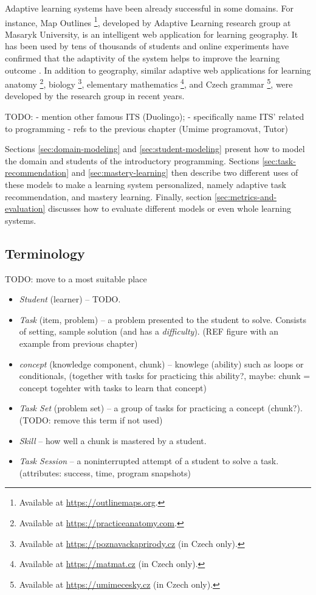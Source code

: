 Adaptive learning systems have been already successful in some domains.
For instance, Map Outlines%
  \footnote{Available at \url{https://outlinemaps.org}.},
  developed by Adaptive Learning research group at Masaryk University,
  is an intelligent web application for learning geography.
It has been used by tens of thousands of students
  and online experiments have confirmed
  that the adaptivity of the system helps to improve the learning outcome
  \cite{alg.evaluation-geography}.
In addition to geography, similar adaptive web applications
  for learning anatomy%
  \footnote{Available at \url{https://practiceanatomy.com}.},
  biology%
  \footnote{Available at \url{https://poznavackaprirody.cz} (in Czech only).},
  elementary mathematics%
  \footnote{Available at \url{https://matmat.cz} (in Czech only).},
  and Czech grammar%
  \footnote{Available at \url{https://umimecesky.cz} (in Czech only).},
  were developed by the research group in recent years.

TODO:
- mention other famous ITS (Duolingo);
- specifically name ITS' related to programming - refs to the previous
chapter (Umime programovat, Tutor)


Sections \ref{sec:domain-modeling} and \ref{sec:student-modeling} present how
to model the domain and students of the introductory programming.
Sections \ref{sec:task-recommendation} and \ref{sec:mastery-learning}
then describe two different uses of these models to make a learning system
personalized, namely adaptive task recommendation, and mastery learning.
Finally, section \ref{sec:metrics-and-evaluation} discusses how to evaluate
different models or even whole learning systems.

\subsection{Terminology}

TODO: move to a most suitable place

\begin{itemize}
\item \emph{Student} (learner) -- TODO.
\item \emph{Task} (item, problem)
  -- a problem presented to the student to solve.
  Consists of setting, sample solution (and has a \emph{difficulty}).
  (REF figure with an example from previous chapter)
\item \emph{concept} (knowledge component, chunk)
  -- knowlege (ability) such as loops or conditionals,
  (together with tasks for practicing this ability?,
   maybe: chunk = concept togehter with tasks to learn that concept)
\item \emph{Task Set} (problem set)
  -- a group of tasks for practicing a concept (chunk?).
  (TODO: remove this term if not used)
\item \emph{Skill}
  -- how well a chunk is mastered by a student.
\item \emph{Task Session}
  -- a noninterrupted attempt of a student to solve a task.
  (attributes: success, time, program snapshots)
\end{itemize}

